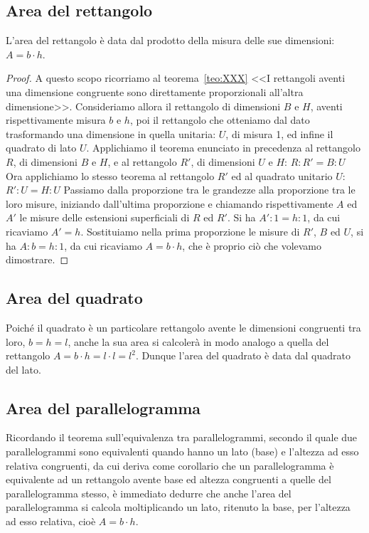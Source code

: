 \subsection{Area del rettangolo}

\begin{teorema}
L’area del rettangolo è data dal prodotto della misura delle sue dimensioni: $A=b\cdot h$.
\end{teorema}

\begin{proof}
A questo scopo ricorriamo al teorema~\ref{teo:XXX} <<I rettangoli aventi una dimensione congruente sono direttamente proporzionali all'altra dimensione>>. Consideriamo allora il rettangolo di dimensioni $B$ e $H$, aventi rispettivamente misura $b$ e $h$, poi il rettangolo che otteniamo dal dato trasformando una dimensione in quella unitaria: $U$, di misura 1, ed infine il quadrato di lato $U$.
Applichiamo il teorema enunciato in precedenza al rettangolo $R$, di dimensioni $B$ e $H$, e al rettangolo $R'$, di dimensioni $U$ e $H$:
$R : R' = B : U$
Ora applichiamo lo stesso teorema al rettangolo $R'$ ed al quadrato unitario $U$:
$R' : U = H : U$
Passiamo dalla proporzione tra le grandezze alla proporzione tra le loro misure, iniziando dall'ultima proporzione e chiamando rispettivamente $A$ ed $A'$ le misure delle estensioni superficiali di $R$ ed $R'$. Si ha $A' : 1 = h : 1$, da cui ricaviamo $A' = h$.
Sostituiamo nella prima proporzione le misure di $R'$, $B$ ed $U$, si ha $A : b = h : 1$, da cui ricaviamo $A=b\cdot h$, che è proprio ciò che volevamo dimostrare.
\end{proof}

\subsection{Area del quadrato}

Poiché il quadrato è un particolare rettangolo avente le dimensioni congruenti tra loro, $b = h = l$, anche la sua area si calcolerà in modo analogo a quella del rettangolo $A=b\cdot h=l\cdot l=l^2$.
Dunque l'area del quadrato è data dal quadrato del lato.

\subsection{Area del parallelogramma}

Ricordando il teorema sull'equivalenza tra parallelogrammi, secondo il quale due parallelogrammi sono equivalenti quando hanno un lato (base) e l'altezza ad esso relativa congruenti, da cui deriva come corollario che un parallelogramma è equivalente ad un rettangolo avente base ed altezza congruenti a quelle del parallelogramma stesso, è immediato dedurre che anche l'area del parallelogramma si calcola moltiplicando un lato, ritenuto la base, per l'altezza ad esso relativa, cioè $A=b\cdot h$.

